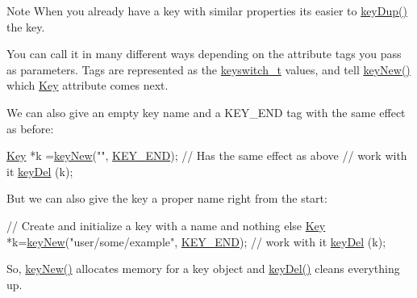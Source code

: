 \begin{DoxyNote}{Note}
When you already have a key with similar properties its easier to \hyperlink{group__key_gae6ec6a60cc4b8c1463fa08623d056ce3}{key\-Dup()} the key.
\end{DoxyNote}
You can call it in many different ways depending on the attribute tags you pass as parameters. Tags are represented as the \hyperlink{group__key_ga91fb3178848bd682000958089abbaf40}{keyswitch\-\_\-t} values, and tell \hyperlink{group__key_gad23c65b44bf48d773759e1f9a4d43b89}{key\-New()} which \hyperlink{classkdb_1_1Key}{Key} attribute comes next.

We can also give an empty key name and a K\-E\-Y\-\_\-\-E\-N\-D tag with the same effect as before\-:


\begin{DoxyCodeInclude}
\hyperlink{classkdb_1_1Key_a5679f5cae63caddd64a60388b9cc77fa}{Key} *k =\hyperlink{group__key_gad23c65b44bf48d773759e1f9a4d43b89}{keyNew}(\textcolor{stringliteral}{""}, \hyperlink{group__key_gga91fb3178848bd682000958089abbaf40aa8adb6fcb92dec58fb19410eacfdd403}{KEY\_END}); \textcolor{comment}{// Has the same effect as above}
\textcolor{comment}{// work with it}
\hyperlink{group__key_ga3df95bbc2494e3e6703ece5639be5bb1}{keyDel} (k);
\end{DoxyCodeInclude}
 But we can also give the key a proper name right from the start\-:


\begin{DoxyCodeInclude}
\textcolor{comment}{// Create and initialize a key with a name and nothing else}
\hyperlink{classkdb_1_1Key_a5679f5cae63caddd64a60388b9cc77fa}{Key} *k=\hyperlink{group__key_gad23c65b44bf48d773759e1f9a4d43b89}{keyNew}(\textcolor{stringliteral}{"user/some/example"}, \hyperlink{group__key_gga91fb3178848bd682000958089abbaf40aa8adb6fcb92dec58fb19410eacfdd403}{KEY\_END});
\textcolor{comment}{// work with it}
\hyperlink{group__key_ga3df95bbc2494e3e6703ece5639be5bb1}{keyDel} (k);
\end{DoxyCodeInclude}
 So, \hyperlink{group__key_gad23c65b44bf48d773759e1f9a4d43b89}{key\-New()} allocates memory for a key object and \hyperlink{group__key_ga3df95bbc2494e3e6703ece5639be5bb1}{key\-Del()} cleans everything up.

